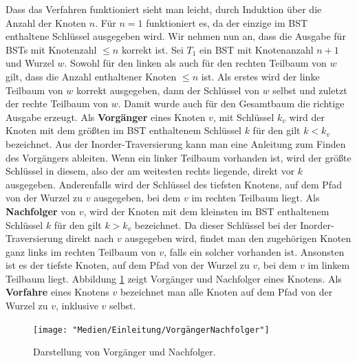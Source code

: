 \documentclass[a4paper,12pt]{article}
\begin{document}
\noindent Dass das Verfahren funktioniert sieht man leicht, durch Induktion über die Anzahl der Knoten $n$.
Für $n = 1$ funktioniert es, da der einzige im BST enthaltene Schlüssel ausgegeben wird. Wir nehmen nun an, dass die Ausgabe für BSTs mit Knotenzahl $\leq n$ korrekt ist. Sei $T_1$ ein BST mit Knotenanzahl $n + 1$ und Wurzel $w$. Sowohl für den linken als auch für den rechten Teilbaum von $w$ gilt, dass die Anzahl enthaltener Knoten $\leq n$ ist. Als erstes wird der linke Teilbaum von $w$ korrekt ausgegeben, dann der Schlüssel von $w$ selbst und zuletzt der rechte Teilbaum von $w$. Damit wurde auch für den Gesamtbaum die richtige
Ausgabe erzeugt. 
Als \textbf{Vorgänger} eines Knoten $v$, mit Schlüssel $k_v$ wird der Knoten mit dem größten im BST enthaltenem Schlüssel $k$ für den gilt $k < k_v$ bezeichnet. Aus der Inorder-Traversierung kann man eine Anleitung zum Finden des Vorgängers ableiten. Wenn ein linker Teilbaum vorhanden ist, wird der größte Schlüssel in diesem, also der am weitesten rechts liegende, direkt vor $k$ ausgegeben. Anderenfalls wird der Schlüssel des tiefsten Knotens, auf dem Pfad von der Wurzel zu $v$ ausgegeben, bei dem $v$ im rechten Teilbaum liegt. Als \textbf{Nachfolger} von $v$, wird der Knoten mit dem kleinsten im BST enthaltenem Schlüssel $k$ für den gilt $k > k_v$ bezeichnet.
Da dieser Schlüssel bei der Inorder-Traversierung direkt nach $v$ ausgegeben wird, findet man den zugehörigen Knoten ganz links im rechten Teilbaum von $v$, falls ein solcher vorhanden ist. Ansonsten ist es der tiefste Knoten, auf dem Pfad von der Wurzel zu $v$, bei dem $v$ im linkem Teilbaum liegt. Abbildung \ref{fig:VorgängerNachfolger} zeigt Vorgänger und Nachfolger eines Knotens. Als \textbf{Vorfahre} eines Knotens $v$ bezeichnet man alle Knoten auf dem Pfad von der Wurzel zu $v$, inklusive $v$ selbst. 

\begin{figure}[h]
	\centering
	\texttt{[image: "Medien/Einleitung/VorgängerNachfolger"]}
	\caption{Darstellung von Vorgänger und Nachfolger. }
	\label{fig:VorgängerNachfolger}
\end{figure}
\end{document}
